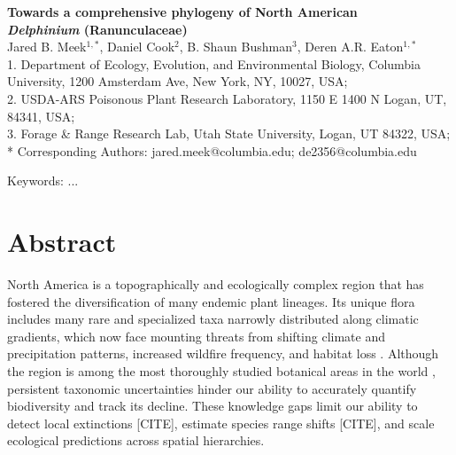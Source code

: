 \documentclass[11pt]{article}
\begin{document}
\begin{center}
	{\bf \Large
	Towards a comprehensive phylogeny of North American \\
	\emph{Delphinium} (Ranunculaceae)
	}\\[0.5cm]

Jared B. Meek$^{1,*}$, Daniel Cook$^2$, B. Shaun Bushman$^3$, Deren A.R. Eaton$^{1,*}$\\[0.5cm]

1. Department of Ecology, Evolution, and Environmental Biology, Columbia University, 1200 Amsterdam Ave, New York, NY, 10027, USA;\\
2. USDA-ARS Poisonous Plant Research Laboratory, 1150 E 1400 N Logan, UT, 84341, USA;\\ 3. Forage \& Range Research Lab, Utah State University, Logan, UT 84322, USA;\\ 
* Corresponding Authors: jared.meek@columbia.edu; de2356@columbia.edu

\end{center}

Keywords: ...

\RaggedRight

\section*{Abstract}
North America is a topographically and ecologically complex region that has fostered the 
diversification of many endemic plant lineages. Its unique flora includes many rare and
specialized taxa narrowly distributed along climatic gradients, which now face mounting
threats from shifting climate and precipitation patterns, increased wildfire frequency, and habitat loss
\citep{kannenberg_rapid_2021,overpeck_climate_2020}.
% 
Although the region is among the most thoroughly studied botanical areas in the world
\citep{hickman1993jepson}, persistent taxonomic uncertainties hinder our ability to
accurately quantify biodiversity and track its decline. These knowledge gaps limit our ability to detect local extinctions [CITE], estimate species range shifts [CITE],
and scale ecological predictions across spatial hierarchies. 
\end{document}

